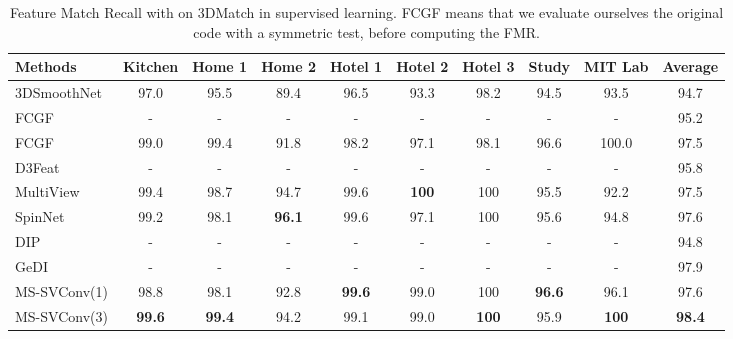 \documentclass[10pt,twocolumn,letterpaper]{article}
\begin{document}
\begin{table*}[ht]
\small
\centering
\begin{tabular}[t]{lccccccccc}
\toprule
Methods & Kitchen & Home 1 & Home 2 & Hotel 1 & Hotel 2 & Hotel 3 & Study & MIT Lab & Average \\
\midrule
3DSmoothNet~\cite{gojcic2018perfect} &97.0&95.5&89.4&96.5&93.3&98.2&94.5&93.5&94.7\\
FCGF~\cite{choy2019fully} &-&-&-&-&-&-&-&-&95.2\\
FCGF~\cite{choy2019fully} &99.0&99.4&91.8&98.2&97.1&98.1&96.6&100.0&97.5\\
D3Feat~\cite{bai2020d3feat} &-&-&-&-&-&-&-&-&95.8\\
MultiView~\cite{Li_2020_CVPR} &99.4&98.7&94.7&99.6& \bf{100} &100&95.5&92.2&97.5\\
SpinNet~\cite{ao2020SpinNet} &99.2&98.1& \bf{96.1} & 99.6 &97.1&100&95.6&94.8&97.6\\
DIP~\cite{Poiesi2021} &-&-&-&-&-&-&-&-& 94.8\\
GeDI~\cite{Poiesi2021gedi} &-&-&-&-&-&-&-&-& 97.9\\
MS-SVConv(1) &98.8&98.1&92.8&\bf{99.6}&99.0&100& \bf{96.6} &96.1&97.6\\
MS-SVConv(3) & \bf{99.6} & \bf{99.4} & 94.2 & 99.1 & 99.0 & \bf{100} & 95.9 & \bf{100} & \bf{98.4} \\
\bottomrule
\end{tabular}
\caption{Feature Match Recall with  on 3DMatch in supervised learning. FCGF means that we evaluate ourselves the original code with a symmetric test, before computing the FMR.}
\label{tab:supervised20}
\end{table*}
\end{document}

